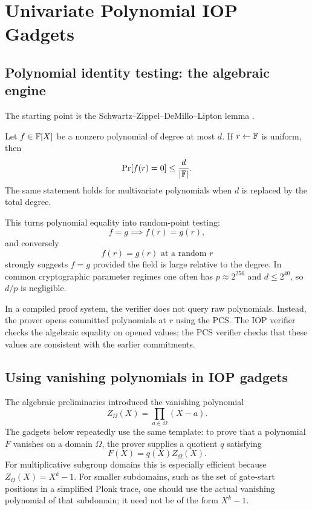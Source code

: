 ﻿\section{Univariate Polynomial IOP Gadgets}

\subsection{Polynomial identity testing: the algebraic engine}

The starting point is the Schwartz--Zippel--DeMillo--Lipton lemma \cite{DeMilloLipton1978,Schwartz1980,Zippel1979}.

\begin{lemma}
Let $f\in \mathbb{F}[X]$ be a nonzero polynomial of degree at most $d$. If $r\leftarrow \mathbb{F}$ is uniform, then
\[
\Pr[f(r)=0]\le \frac{d}{|\mathbb{F}|}.
\]
The same statement holds for multivariate polynomials when $d$ is replaced by the total degree.
\end{lemma}

This turns polynomial equality into random-point testing:
\[
    f=g \implies f(r)=g(r),
\]
and conversely
\[
    f(r)=g(r) \text{ at a random }r
\]
strongly suggests $f=g$ provided the field is large relative to the degree. In common cryptographic parameter regimes one often has $p\approx 2^{256}$ and $d\le 2^{40}$, so $d/p$ is negligible.

In a compiled proof system, the verifier does not query raw polynomials. Instead, the prover opens committed polynomials at $r$ using the PCS. The IOP verifier checks the algebraic equality on opened values; the PCS verifier checks that these values are consistent with the earlier commitments.

\subsection{Using vanishing polynomials in IOP gadgets}

The algebraic preliminaries introduced the vanishing polynomial
\[
    Z_\Omega(X)=\prod_{a\in\Omega}(X-a).
\]
The gadgets below repeatedly use the same template: to prove that a polynomial $F$ vanishes on a domain $\Omega$, the prover supplies a quotient $q$ satisfying
\[
    F(X)=q(X)Z_\Omega(X).
\]
For multiplicative subgroup domains this is especially efficient because $Z_\Omega(X)=X^k-1$. For smaller subdomains, such as the set of gate-start positions in a simplified Plonk trace, one should use the actual vanishing polynomial of that subdomain; it need not be of the form $X^k-1$.

